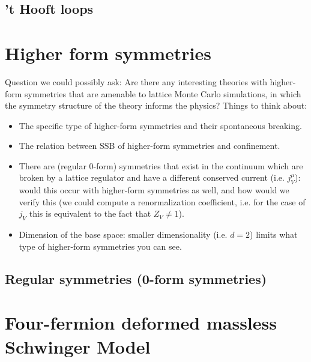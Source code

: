\subsection{'t Hooft loops}

\begin{interlude}[Linking]

\end{interlude}

\newpage
\section{Higher form symmetries}

{\color{red}Question we could possibly ask:} Are there any interesting theories with higher-form symmetries that are amenable to lattice Monte Carlo simulations, in which the symmetry structure of the theory informs the physics? Things to think about: 
\begin{itemize}
	\item The specific type of higher-form symmetries and their spontaneous breaking.
	\item The relation between SSB of higher-form symmetries and confinement. 
	\item There are (regular 0-form) symmetries that exist in the continuum which are broken by a lattice regulator and have a different conserved current (i.e. $j_V^\mu$): would this occur with higher-form symmetries as well, and how would we verify this (we could compute a renormalization coefficient, i.e. for the case of $j_V$ this is equivalent to the fact that $Z_V\neq 1$). 
	\item Dimension of the base space: smaller dimensionality (i.e. $d = 2$) limits what type of higher-form symmetries you can see. 
\end{itemize}

\subsection{Regular symmetries (0-form symmetries)}

\newpage
\section{Four-fermion deformed massless Schwinger Model}

